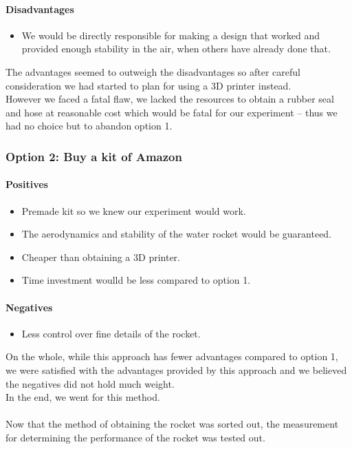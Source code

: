 \documentclass[14pt]{article}
\begin{document}
\paragraph{Disadvantages}
\begin{itemize}
    \item We would be directly responsible for making a design that worked and provided enough stability in the air, when others have already done that.

\end{itemize}
The advantages seemed to outweigh the disadvantages so after careful consideration we had started to plan for using a 3D printer instead.\\
However we faced a fatal flaw, we lacked the resources to obtain a rubber seal and hose at reasonable cost which would be fatal for our experiment -- thus we had no choice but to abandon option 1.
\subsubsection{Option 2: Buy a kit of Amazon}
\paragraph{Positives}
\begin{itemize}
    \item Premade kit so we knew our experiment would work.
    \item The aerodynamics and stability of the water rocket would be guaranteed.
    \item Cheaper than obtaining a 3D printer.
    \item Time investment woulld be less compared to option 1.
\end{itemize}
\paragraph{Negatives}
\begin{itemize}
    \item Less control over fine details of the rocket.
\end{itemize}
On the whole, while this approach has fewer advantages compared to option 1, we were satisfied with the advantages provided by this approach and we believed the negatives did not hold much weight. 
\\In the end, we went for this method.
\\\\
Now that the method of obtaining the rocket was sorted out, the measurement for determining the performance of the rocket was tested out.
\end{document}

